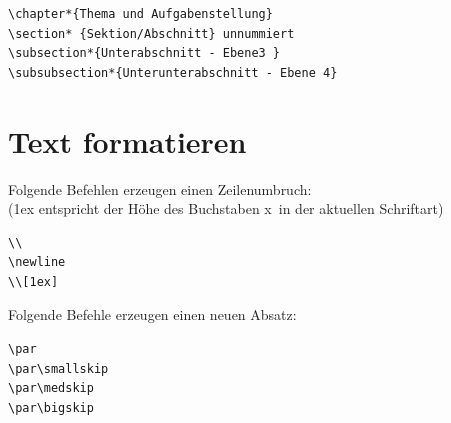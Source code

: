 \documentclass{like}
\begin{document}
\begin{minipage}{0.2\textwidth}
\begin{verbatim}
\chapter*{Thema und Aufgabenstellung}
\section* {Sektion/Abschnitt} unnummiert 
\subsection*{Unterabschnitt - Ebene3 } 
\subsubsection*{Unterunterabschnitt - Ebene 4}
 \end{verbatim}
 \end{minipage}


\section{Text formatieren}

Folgende Befehlen erzeugen einen Zeilenumbruch:\\ (1ex entspricht der Höhe des Buchstaben \glqq x\grqq\ in der aktuellen Schriftart)\par\medskip
\qquad\begin{minipage}{0.8\textwidth}
\begin{verbatim}
\\
\newline
\\[1ex]
\end{verbatim}
\end{minipage}\par\bigskip

Folgende Befehle erzeugen einen neuen Absatz:

\qquad\begin{minipage}{0.8\textwidth}
\begin{verbatim}
\par
\par\smallskip
\par\medskip
\par\bigskip
\end{verbatim}
\end{minipage}\par\bigskip
\end{document}
